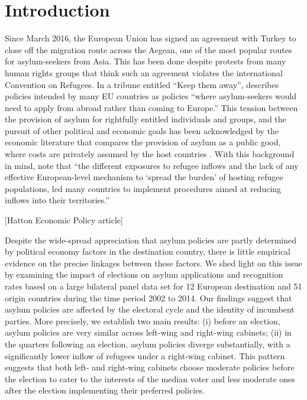 \documentclass[a4paper,12pt]{article}
\begin{document}
\section{Introduction}\label{Introduction}
Since March 2016, the European Union has signed an agreement with Turkey to close off the migration route across the Aegean, one of the most popular routes for asylum-seekers from Asia. This has been done despite protests from many human rights groups that think such an agreement violates the international Convention on Refugees. In a tribune entitled ``Keep them away'', \textit{\cite{Economist2017}} describes policies intended by many EU countries as policies ``where asylum-seekers would need to apply from abroad rather than coming to Europe.'' This tension between the provision of asylum for rightfully entitled individuals and groups, and the pursuit of other political and economic goals has been acknowledged by the economic literature that compares the provision of asylum as a public good, where costs are privately assumed by the host countries \citep{moraga2014}. With this background in mind, \cite{dustmann2016} note that ``the  different  exposures  to  refugee  inflows and  the  lack  of  any  effective  European-level  mechanism  to  `spread  the  burden'  of  hosting  refugee  populations,  led  many  countries  to  implement  procedures  aimed  at  reducing  inflows  into  their  territories.''

[Hatton Economic Policy article]

Despite the wide-spread appreciation that asylum policies are partly determined by political economy factors in the destination country, there is little empirical evidence on the precise linkages between these factors. We shed light on this issue by examining the impact of elections on asylum applications and recognition rates based on a large bilateral panel data set for 12 European destination and 51 origin countries during the time period 2002 to 2014. Our findings suggest that asylum policies are affected by the electoral cycle and the identity of incumbent parties. More precisely, we establish two main results: (i) before an election, asylum policies are very similar across left-wing and right-wing cabinets; (ii)  in the quarters following an election, asylum policies diverge substantially, with a significantly lower inflow of refugees under a right-wing cabinet. This pattern suggests that both left- and right-wing cabinets choose moderate policies before the election to cater to the interests of the median voter and less moderate ones after the election implementing their preferred policies. 
\end{document}
